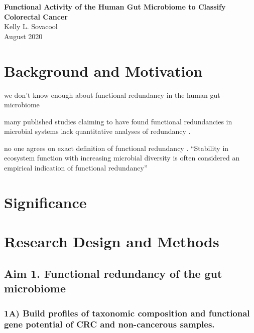 \documentclass[11pt]{article}
\begin{document}
\sloppy
\begin{center}
\large{\textbf{
    Functional Activity of the Human Gut Microbiome to Classify Colorectal Cancer
}} \\
\vspace{11pt}
\small{
    Kelly L. Sovacool \\
    August 2020
}
\end{center}



\section*{Background and Motivation} %


we don't know enough about functional redundancy in the human gut microbiome \cite{heintz-buschart_human_2018}

many published studies claiming to have found functional redundancies in microbial systems lack quantitative analyses of redundancy \cite{souza_metagenomic_2015, ferrer_microbiota_2013}.

no one agrees on exact definition of functional redundancy \cite{louca_function_2018, heintz-buschart_human_2018, tully_dynamic_2018, royalty_quantitative_2020}.
``Stability in ecosystem function with increasing microbial diversity is often considered an empirical indication of functional redundancy''
\cite{royalty_quantitative_2020}

\section*{Significance} %


\section*{Research Design and Methods}

\subsection*{Aim 1. Functional redundancy of the gut microbiome}

\subsubsection*{1A) Build profiles of taxonomic composition and functional gene potential of CRC and non-cancerous samples.}
\end{document}
